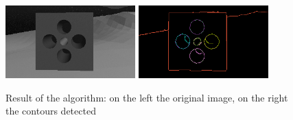 \begin{figure}[H]
	\centering
	\includegraphics[width=5.0cm]{BoundBox_sourceOnlyPolig}
	\qquad
	\includegraphics[width=5.0cm]{BoundBox_resultOnlyPolig}
	\caption{Result of the algorithm: on the left the original image, on the right the contours detected}
	\label{fig:BoundBoxresultOnlyPolig}
\end{figure}

